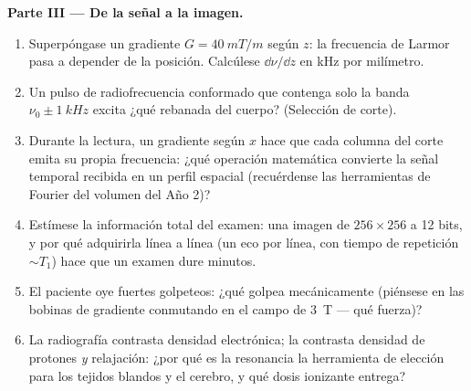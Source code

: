 \begin{problem}
\medskip\noindent\textbf{Parte III --- De la señal a la imagen.}
\begin{enumerate}[resume]
  \item Superpóngase un gradiente $G = \qty{40}{mT/m}$ según $z$: la
        frecuencia de Larmor pasa a depender de la posición. Calcúlese
        $\dd\nu/\dd z$ en kHz por milímetro.
  \item Un pulso de radiofrecuencia conformado que contenga solo la
        banda $\nu_0 \pm
        \qty{1}{kHz}$ excita ¿qué rebanada del cuerpo?
        (Selección de corte).
  \item Durante la lectura, un gradiente según $x$ hace que cada columna
        del corte emita su propia frecuencia: ¿qué operación matemática
        convierte la señal temporal recibida en un perfil espacial
        (recuérdense las herramientas de Fourier del volumen del Año 2)?
  \item Estímese la información total del examen: una imagen de
        $256 \times 256$ a 12 bits, y por qué adquirirla línea a línea
        (un eco por línea, con tiempo de repetición $\sim T_1$) hace que
        un examen dure minutos.
  \item El paciente oye fuertes golpeteos: ¿qué golpea mecánicamente
        (piénsese en las bobinas de gradiente conmutando en el campo de
        \qty{3}{T} --- qué fuerza)?
  \item La radiografía contrasta densidad electrónica; la  contrasta densidad de protones \emph{y} relajación: ¿por
        qué es la resonancia la herramienta de elección para los tejidos
        blandos y el cerebro, y qué dosis ionizante entrega?
\end{enumerate}


\end{problem}
